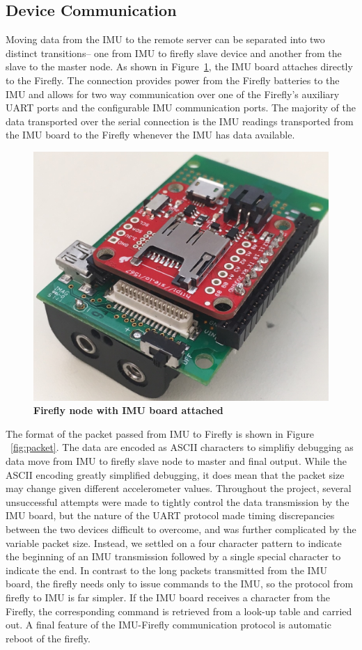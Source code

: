 \documentclass[conference]{IEEEtran}
\begin{document}
\subsection{Device Communication}
Moving data from the IMU to the remote server can be separated into two distinct
transitions-- one from IMU to firefly slave device and another from the slave to the
master node. As shown in Figure~\ref{fig:ff}, the IMU board attaches directly to the
Firefly. The connection provides power from the Firefly batteries to the IMU and allows
for two way communication over one of the Firefly's auxiliary UART ports and the
configurable IMU communication ports. The majority of the data transported over the serial
connection is the IMU readings transported from the IMU board to the Firefly whenever the
IMU has data available. 

\begin{figure}[ht]
  \centering
  \includegraphics[width=0.75\columnwidth]{figs/cropped2}
  \caption{{\bf Firefly node with IMU board attached}}
  \label{fig:ff}
\end{figure}

  The format of the packet passed from IMU to Firefly is shown in
Figure ~\ref{fig:packet}. The data are encoded as ASCII characters to simplifiy debugging
as data move from IMU to firefly slave node to master and final output. While the ASCII
encoding greatly simplified debugging, it does mean that the packet size may change given
different accelerometer values.  Throughout the project, several unsuccessful attempts
were made to tightly control the data transmission by the IMU board, but the nature of the
UART protocol made timing discrepancies between the two devices difficult to overcome, and
was further complicated by the variable packet size. Instead, we settled on a four
character pattern to indicate the beginning of an IMU transmission followed by a single
special character to indicate the end. In contrast to the long packets transmitted from
the IMU board, the firefly needs only to issue commands to the IMU, so the protocol from
firefly to IMU is far simpler. If the IMU board receives a character from the Firefly, the
corresponding command is retrieved from a look-up table and carried out. A final feature
of the IMU-Firefly communication protocol is automatic reboot of the firefly. 
\end{document}
